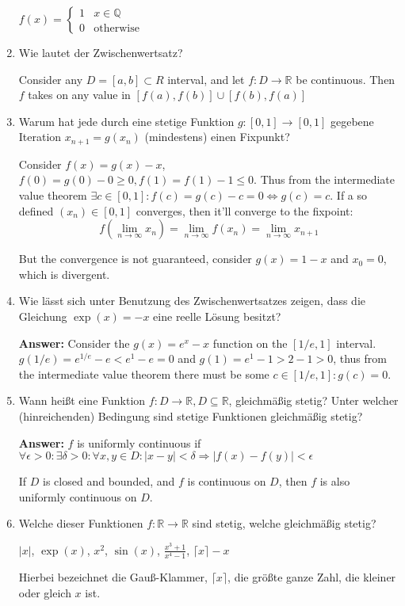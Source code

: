 \documentclass[11pt]{article}
\begin{document}
\begin{enumerate}
$f(x) = \begin{cases}
    1&x\in \mathbb{Q}\\
    0&\text{otherwise}
\end{cases}$

\item Wie lautet der Zwischenwertsatz?

Consider any $D = [a, b] \subset R$ interval, and let $f\colon D \to \mathbb{R}$ be continuous. Then $f$ takes on any value in $[f(a), f(b)] \cup [f(b), f(a)]$

\item Warum hat jede durch eine stetige Funktion $g\colon [0,1] \to [0,1]$ gegebene Iteration $x_{n+1} = g(x_n)$ (mindestens) einen Fixpunkt?

Consider $f(x) = g(x) - x$, $f(0) = g(0) - 0 \ge 0, f(1) = f(1) - 1 \le 0$. Thus from the intermediate value theorem $\exists c\in[0, 1]\colon f(c) = g(c) - c = 0 \Leftrightarrow g(c) = c$. If a so defined $(x_n) \in [0,1]$ converges, then it'll converge to the fixpoint:
$$f(\lim_{n\to\infty} x_n) = \lim_{n\to\infty} f(x_n) = \lim_{n\to\infty} x_{n+1}$$

But the convergence is not guaranteed, consider $g(x) = 1-x$ and $x_0 = 0$, which is divergent.


\item Wie lässt sich unter Benutzung des Zwischenwertsatzes zeigen, dass die Gleichung $\exp(x) = -x$ eine reelle Lösung besitzt?

\textbf{Answer:} Consider the $g(x) = e^x - x$ function on the $[1/e, 1]$ interval. $g(1/e) = e^{1/e} - e < e^1 - e = 0$ and $g(1) = e^1 - 1 > 2 - 1 > 0$, thus from the intermediate value theorem there must be some $c \in [1/e, 1]\colon g(c) = 0$.

\item Wann heißt eine Funktion $f\colon D \to \mathbb{R}, D \subseteq \mathbb{R}$, gleichmäßig stetig? Unter welcher (hinreichenden) Bedingung sind stetige Funktionen gleichmäßig stetig?

\textbf{Answer:} $f$ is uniformly continuous if $\forall \epsilon > 0\colon \exists \delta > 0\colon \forall x, y \in D\colon | x - y| < \delta \Rightarrow |f(x) - f(y) | < \epsilon$

If $D$ is closed and bounded, and $f$ is continuous on $D$, then $f$ is also uniformly continuous on $D$.

\item  Welche dieser Funktionen $f\colon \mathbb{R} \to \mathbb{R}$ sind stetig, welche gleichmäßig stetig?
 \begin{center}
    $|x|$,   $\operatorname{exp}(x)$, $x^2$, $\sin(x)$, $\frac{x^3+1}{x^4-1}$, $\lceil x \rceil - x$
\end{center}
Hierbei bezeichnet die Gauß-Klammer, $\lceil x \rceil$, die größte ganze Zahl, die kleiner oder gleich $x$ ist.


\end{enumerate}
\end{document}
